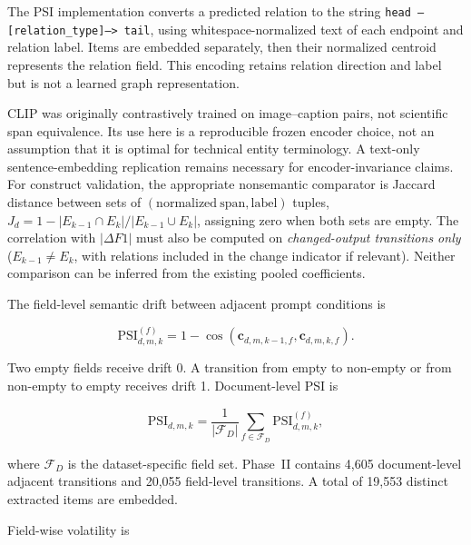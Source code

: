 \documentclass[fleqn,10pt]{wlscirep-authoryear}
\begin{document}
The PSI implementation converts a predicted relation to the string
\texttt{head --[relation\_type]--> tail}, using whitespace-normalized
text of each endpoint and relation label. Items are embedded separately, then
their normalized centroid represents the relation field. This encoding retains
relation direction and label but is not a learned graph representation.

CLIP was originally contrastively trained on image--caption pairs, not scientific
span equivalence. Its use here is a reproducible frozen encoder choice, not an
assumption that it is optimal for technical entity terminology. A text-only
sentence-embedding replication remains necessary for encoder-invariance claims.
For construct validation, the appropriate nonsemantic comparator is Jaccard
distance between sets of \((\mathrm{normalized\ span},\mathrm{label})\) tuples,
\(J_d=1-|E_{k-1}\cap E_k|/|E_{k-1}\cup E_k|\), assigning zero when both
sets are empty. The correlation with \(|\Delta F1|\) must also be computed on
\emph{changed-output transitions only} (\(E_{k-1}\neq E_k\), with relations
included in the change indicator if relevant). Neither comparison can be
inferred from the existing pooled coefficients.

The field-level semantic drift between adjacent prompt conditions is

\begin{equation}
\mathrm{PSI}^{(f)}_{d,m,k}
=
1-
\cos
\left(
\mathbf{c}_{d,m,k-1,f},
\mathbf{c}_{d,m,k,f}
\right).
\label{eq:psi-field}
\end{equation}

Two empty fields receive drift 0. A transition from empty to non-empty or from
non-empty to empty receives drift 1. Document-level PSI is

\begin{equation}
\mathrm{PSI}_{d,m,k}
=
\frac{1}{|\mathcal{F}_D|}
\sum_{f\in\mathcal{F}_D}
\mathrm{PSI}^{(f)}_{d,m,k},
\label{eq:psi-doc}
\end{equation}

where $\mathcal{F}_D$ is the dataset-specific field set. Phase~II contains 4,605
document-level adjacent transitions and 20,055 field-level transitions. A total
of 19,553 distinct extracted items are embedded.

Field-wise volatility is
\end{document}
